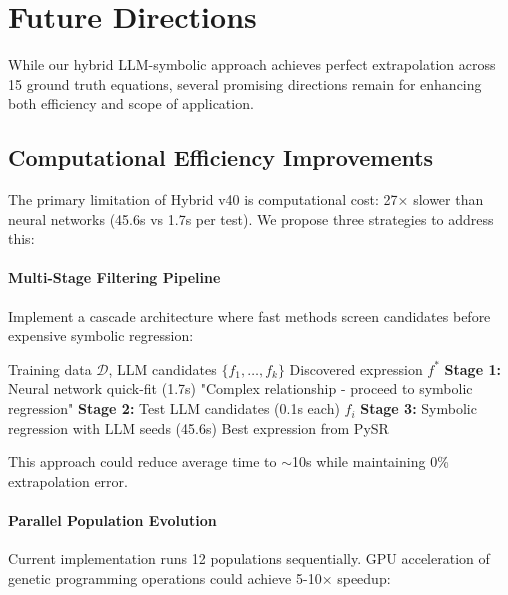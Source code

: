 \section{Future Directions}
\label{sec:future}

While our hybrid LLM-symbolic approach achieves perfect extrapolation across 15 ground truth equations, several promising directions remain for enhancing both efficiency and scope of application.

\subsection{Computational Efficiency Improvements}

The primary limitation of Hybrid v40 is computational cost: 27× slower than neural networks (45.6s vs 1.7s per test). We propose three strategies to address this:

\paragraph{Multi-Stage Filtering Pipeline}
Implement a cascade architecture where fast methods screen candidates before expensive symbolic regression:

\begin{algorithm}[htbp]
\caption{Efficient Hybrid Discovery Pipeline}
\begin{algorithmic}[1]
\REQUIRE Training data $\mathcal{D}$, LLM candidates $\{f_1, \ldots, f_k\}$
\ENSURE Discovered expression $f^*$
\STATE \textbf{Stage 1:} Neural network quick-fit (1.7s)
    \RETURN "Complex relationship - proceed to symbolic regression"
\ENDIF
\STATE \textbf{Stage 2:} Test LLM candidates (0.1s each)
        \RETURN $f_i$ 
    \ENDIF
\ENDFOR
\STATE \textbf{Stage 3:} Symbolic regression with LLM seeds (45.6s)
\RETURN Best expression from PySR
\end{algorithmic}
\end{algorithm}

This approach could reduce average time to $\sim$10s while maintaining 0\% extrapolation error.

\paragraph{Parallel Population Evolution}
Current implementation runs 12 populations sequentially. GPU acceleration of genetic programming operations \citep{harding2011evolution} could achieve 5-10× speedup:

